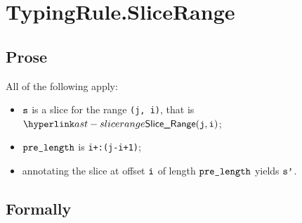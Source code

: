 
\section{TypingRule.SliceRange \label{sec:TypingRule.SliceRange}}

\subsection{Prose}
All of the following apply:
\begin{itemize}
  \item $\vs$ is a slice for the range \texttt{(j, i)}, that is $\SliceRange(\vj, \vi)$;
  \item $\prelength$ is \texttt{i+:(j-i+1)};
  \item annotating the slice at offset $\vi$ of length $\prelength$ yields $\vsp$\ProseOrTypeError.
\end{itemize}



\subsection{Formally}
\begin{mathpar}
\end{mathpar}


